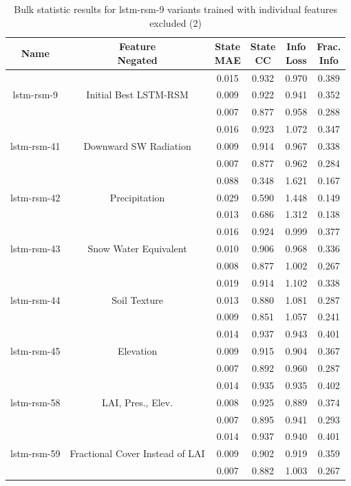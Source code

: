 \begin{table}[H]
    \centering
    \begin{tabular}{c|c|c|c|c|c }
    \small
Name & \thead{Feature \\ Negated} & \thead{State\\MAE} & \thead{State\\CC} & \thead{Info\\Loss} &\thead{Frac.\\Info}\\
\hline
\multirow{3}{6em}{lstm-rsm-9} & \multirow{3}{8em}{Initial Best LSTM-RSM} & 0.015 & 0.932 & 0.970 & 0.389 \\ & & 0.009 & 0.922 & 0.941 & 0.352 \\ & & 0.007 & 0.877 & 0.958 & 0.288 \\
\hline
\multirow{3}{6em}{lstm-rsm-41} & \multirow{3}{8em}{Downward SW Radiation} & 0.016 & 0.923 & 1.072 & 0.347 \\ & & 0.009 & 0.914 & 0.967 & 0.338 \\ & & 0.007 & 0.877 & 0.962 & 0.284 \\
\hline
\multirow{3}{6em}{lstm-rsm-42} & \multirow{3}{8em}{Precipitation} & 0.088 & 0.348 & 1.621 & 0.167 \\ & & 0.029 & 0.590 & 1.448 & 0.149 \\ & & 0.013 & 0.686 & 1.312 & 0.138 \\
\hline
\multirow{3}{6em}{lstm-rsm-43} & \multirow{3}{8em}{Snow Water Equivalent} & 0.016 & 0.924 & 0.999 & 0.377 \\ & & 0.010 & 0.906 & 0.968 & 0.336 \\ & & 0.008 & 0.877 & 1.002 & 0.267 \\
\hline
\multirow{3}{6em}{lstm-rsm-44} & \multirow{3}{8em}{Soil Texture} & 0.019 & 0.914 & 1.102 & 0.338 \\ & & 0.013 & 0.880 & 1.081 & 0.287 \\ & & 0.009 & 0.851 & 1.057 & 0.241 \\
\hline
\multirow{3}{6em}{lstm-rsm-45} & \multirow{3}{8em}{Elevation} & 0.014 & 0.937 & 0.943 & 0.401 \\ & & 0.009 & 0.915 & 0.904 & 0.367 \\ & & 0.007 & 0.892 & 0.960 & 0.287 \\
\hline
\hline
\multirow{3}{6em}{lstm-rsm-58} & \multirow{3}{8em}{LAI, Pres., Elev.} & 0.014 & 0.935 & 0.935 & 0.402 \\ & & 0.008 & 0.925 & 0.889 & 0.374 \\ & & 0.007 & 0.895 & 0.941 & 0.293 \\
\hline
\hline
\multirow{3}{6em}{lstm-rsm-59} & \multirow{3}{8em}{Fractional Cover Instead of LAI} & 0.014 & 0.937 & 0.940 & 0.401 \\ & & 0.009 & 0.902 & 0.919 & 0.359 \\ & & 0.007 & 0.882 & 1.003 & 0.267 \\

\end{tabular}
    \caption{Bulk statistic results for lstm-rsm-9 variants trained with individual features excluded (2)}
    \label{feat-variants-table-2}
\end{table}

